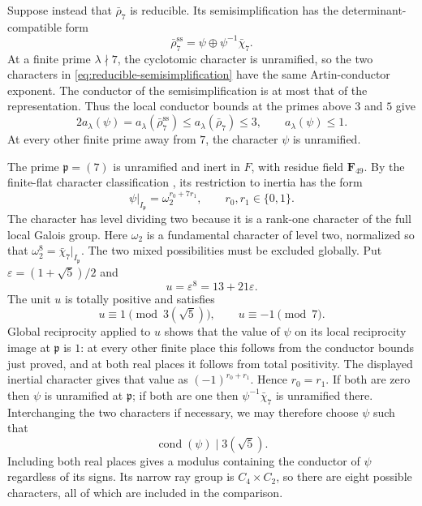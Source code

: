 \documentclass[11pt]{article}
\newcommand{\F}{\mathbf F}
\theoremstyle{definition}
\theoremstyle{remark}
\begin{document}
Suppose instead that $\bar\rho_7$ is reducible.  Its semisimplification has
the determinant-compatible form
\begin{equation}\label{eq:reducible-semisimplification}
 \bar\rho_7^{\mathrm{ss}}
       =\psi\oplus\psi^{-1}\bar\chi_7.
\end{equation}
At a finite prime $\lambda\nmid7$, the cyclotomic character is unramified,
so the two characters in \eqref{eq:reducible-semisimplification} have the
same Artin-conductor exponent.  The conductor of the semisimplification
is at most that of the representation.  Thus the local conductor bounds
at the primes above $3$ and $5$ give
\[
 2a_\lambda(\psi)
 =a_\lambda(\bar\rho_7^{\mathrm{ss}})
 \leq a_\lambda(\bar\rho_7)\leq3,
 \qquad a_\lambda(\psi)\leq1.
\]
At every other finite prime away from $7$, the character $\psi$ is
unramified.

The prime $\mathfrak p=(7)$ is unramified and inert in $F$, with residue
field $\F_{49}$.  By the finite-flat character classification
\cite[Corollary~3.4.4]{Raynaud1974}, its restriction to inertia has the form
\[
 \psi|_{I_{\mathfrak p}}=\omega_2^{r_0+7r_1},
 \qquad r_0,r_1\in\{0,1\}.
\]
The character has level dividing two because it is a rank-one character
of the full local Galois group.  Here $\omega_2$ is a fundamental
character of level two, normalized so
that $\omega_2^{8}=\bar\chi_7|_{I_{\mathfrak p}}$.
The two mixed possibilities must be excluded globally.  Put
$\varepsilon=(1+\sqrt5)/2$ and
\[
 u=\varepsilon^8=13+21\varepsilon.
\]
The unit $u$ is totally positive and satisfies
\[
 u\equiv1\pmod{3(\sqrt5)},\qquad u\equiv-1\pmod{7}.
\]
Global reciprocity applied to $u$ shows that the value of $\psi$ on its
local reciprocity image at $\mathfrak p$ is $1$: at every other finite
place this follows from the conductor bounds just proved, and at both
real places it follows from total positivity.  The displayed inertial
character gives that value as $(-1)^{r_0+r_1}$.  Hence $r_0=r_1$.
If both are zero then $\psi$ is unramified at $\mathfrak p$; if both are
one then $\psi^{-1}\bar\chi_7$ is unramified there.  Interchanging the two
characters if necessary, we may therefore choose $\psi$ such that
\begin{equation}\label{eq:character-conductor}
 \operatorname{cond}(\psi)\mid3(\sqrt5).
\end{equation}
Including both real places gives a modulus containing the conductor of
$\psi$ regardless of its signs.  Its narrow ray group is
$C_4\times C_2$, so there are eight possible characters, all of which are
included in the comparison.
\end{document}
